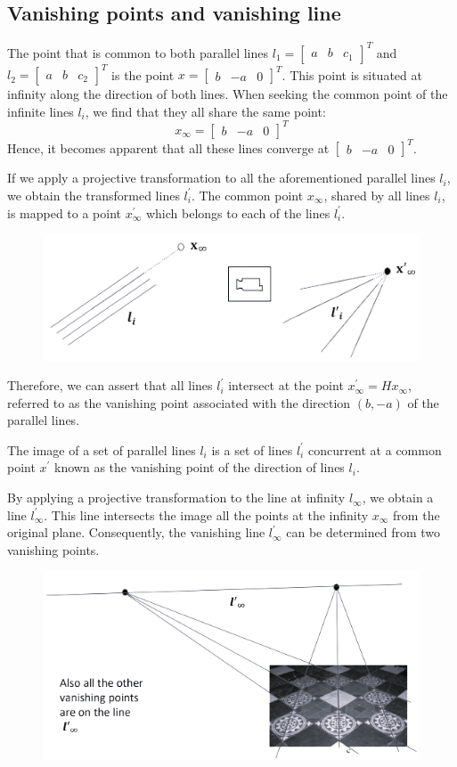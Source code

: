 \subsection{Vanishing points and vanishing line}
The point that is common to both parallel lines $l_1={\begin{bmatrix} a & b & c_1 \end{bmatrix}}^{T}$ and $l_2={\begin{bmatrix} a & b & c_2 \end{bmatrix}}^{T}$ is the point $x={\begin{bmatrix} b & -a & 0 \end{bmatrix}}^{T}$. 
This point is situated at infinity along the direction of both lines.
When seeking the common point of the infinite lines $l_i$, we find that they all share the same point:
\[x_{\infty}={\begin{bmatrix} b & -a & 0 \end{bmatrix}}^{T}\]
Hence, it becomes apparent that all these lines converge at ${\begin{bmatrix} b & -a & 0 \end{bmatrix}}^{T}$. 

If we apply a projective transformation to all the aforementioned parallel lines $l_i$, we obtain the transformed lines $l_i^{'}$. 
The common point $x_{\infty}$, shared by all lines $l_i$, is mapped to a point $x_{\infty}^{'}$ which belongs to each of the lines $l_i^{'}$. 
\begin{figure}[H]
    \centering
    \includegraphics[width=0.5\linewidth]{images/vanishing.png}
\end{figure}
Therefore, we can assert that all lines $l_i^{'}$ intersect at the point $x_{\infty}^{'}=Hx_{\infty}$, referred to as the vanishing point associated with the direction $(b,-a)$ of the parallel lines. 
\begin{theorem}
    The image of a set of parallel lines $l_i$ is a set of lines $l_i^{'}$ concurrent at a common point $x^{'}$ known as the vanishing point of the direction of lines $l_i$. 
\end{theorem}

By applying a projective transformation to the line at infinity $l_{\infty}$, we obtain a line $l_{\infty}^{'}$. 
This line intersects the image all the points at the infinity $x_{\infty}$ from  the original plane. 
Consequently, the vanishing line $l_{\infty}^{'}$ can be determined from two vanishing points. 
\begin{figure}[H]
    \centering
    \includegraphics[width=0.5\linewidth]{images/vanishingline.png}
\end{figure}

